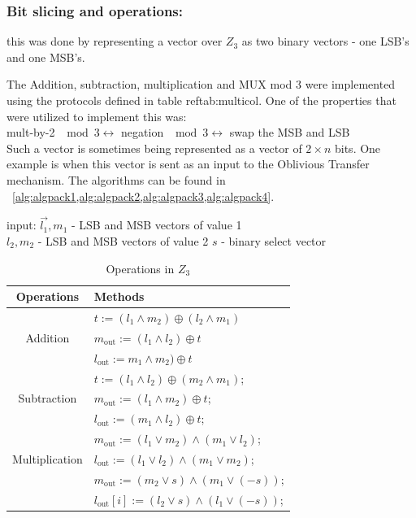 \subsubsection{Bit slicing and operations:} this was done by representing a vector over $Z_3$  as two binary vectors - one LSB's and one MSB's. 

The Addition, subtraction, multiplication and MUX mod 3 were implemented using the protocols defined in table ref{tab:multicol}. One of the properties that were utilized to implement this was:\\
mult-by-2 $\mod 3  \leftrightarrow$ negation $ \mod 3 \leftrightarrow$ swap the MSB and LSB\\

Such a vector is sometimes being represented as a vector of $2 \times n$ bits. One example is when this vector is sent as an input to the Oblivious Transfer mechanism. 
The algorithms can be found in ~\cref{alg:algpack1,alg:algpack2,alg:algpack3,alg:algpack4}.


input:   $\vec{l_1}, {m_1}$ - LSB and MSB vectors of value 1  \\
					${l_2}, {m_2}$ - LSB and MSB vectors of value 2
					${s}$ - binary select vector

\begin{table}[ht]
\caption{Operations in $Z_3$}
\begin{center}
\begin{tabular}{|c|l|}
    \hline
    \textbf{Operations} & \textbf{Methods}\\
    \hline
    \multirow{3}{*}{Addition} & ${t} := ({l_1 \wedge m_2}) \oplus ({l_2 \wedge m_1})$\\
    & $m_{\mathrm{out}} := ( l_1 \wedge  l_2 ) \oplus  t $ \\
    & $l_{\mathrm{out}} :=m_1 \wedge m_2 ) \oplus t $ \\
    \hline
    \multirow{3}{*}{Subtraction} & ${t} := ({l_1} \wedge {l_2}) \oplus ({m_2} \wedge {m_1})$;\\
    & $m_{\mathrm{out}} := (l_1 \wedge m_2 ) \oplus t$;\\
    & $l_{\mathrm{out}} := (m_1 \wedge l_2 ) \oplus t$; \\
    \hline
\multirow{3}{*}{Multiplication} & $m_{\mathrm{out}}:= (l_1 \vee m_2) \wedge   (m_1 \vee l_2)$; \\
    & $l_{\mathrm{out}} := (l_1 \vee l_2) \wedge     (m_1 \vee m_2)$;\\
    \hline
\multirow{3}{*}{MUX} & $m_{\mathrm{out}} :=( m_2 \vee s) \wedge (m_1 \vee (- s) )$; \\
    & $l_{\mathrm{out}}[i] :=( l_2 \vee s) \wedge (l_1 \vee (- s) )$; \\
    \hline

\end{tabular}
\end{center}
\label{tab:multicol}
\end{table}

